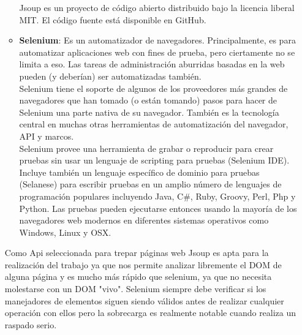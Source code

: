 \begin{itemize}
\begin{itemize}
				Jsoup es un proyecto de código abierto distribuido bajo la licencia liberal MIT. El código fuente está disponible en GitHub.\cite{jsoup}
				
				\item \textbf{Selenium}: Es un automatizador de navegadores. Principalmente, es para automatizar aplicaciones web con fines de prueba, pero ciertamente no se limita a eso. Las tareas de administración aburridas basadas en la web pueden (y deberían) ser automatizadas también.\\
				
				Selenium tiene el soporte de algunos de los proveedores más grandes de navegadores que han tomado (o están tomando) pasos para hacer de Selenium una parte nativa de su navegador. También es la tecnología central en muchas otras herramientas de automatización del navegador, API y marcos.\\
				
				Selenium provee una herramienta de grabar o reproducir para crear pruebas sin usar un lenguaje de scripting para pruebas (Selenium IDE). Incluye también un lenguaje específico de dominio para pruebas (Selanese) para escribir pruebas en un amplio número de lenguajes de programación populares incluyendo Java, C$\#$, Ruby, Groovy, Perl, Php y Python. Las pruebas pueden ejecutarse entonces usando la mayoría de los navegadores web modernos en diferentes sistemas operativos como Windows, Linux y OSX.
				
			\end{itemize}
			Como Api seleccionada para trepar páginas web Jsoup es apta para la realización del trabajo ya que nos permite analizar libremente el DOM de alguna página y es mucho más rápido que selenium, ya que no necesita molestarse con un DOM "vivo". Selenium siempre debe verificar si los manejadores de elementos siguen siendo válidos antes de realizar cualquier operación con ellos pero la sobrecarga es realmente notable cuando realiza un raspado serio. \\
			
		\end{itemize}
		
